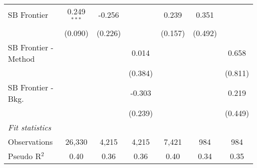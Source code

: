 \begin{tabular}{lcccccc}
   SB Frontier          & 0.249$^{***}$ & -0.256  &              & 0.239   & 0.351   &   \\   
                        & (0.090)       & (0.226) &              & (0.157) & (0.492) &   \\   
   SB Frontier - Method &               &         & 0.014        &         &         & 0.658\\   
                        &               &         & (0.384)      &         &         & (0.811)\\   
   SB Frontier - Bkg.   &               &         & -0.303       &         &         & 0.219\\   
                        &               &         & (0.239)      &         &         & (0.449)\\   
   \midrule
   \emph{Fit statistics}\\
   Observations         & 26,330        & 4,215   & 4,215        & 7,421   & 984     & 984\\  
   Pseudo R$^2$         & 0.40          & 0.36    & 0.36         & 0.40    & 0.34    & 0.35\\  
   

\end{tabular}
